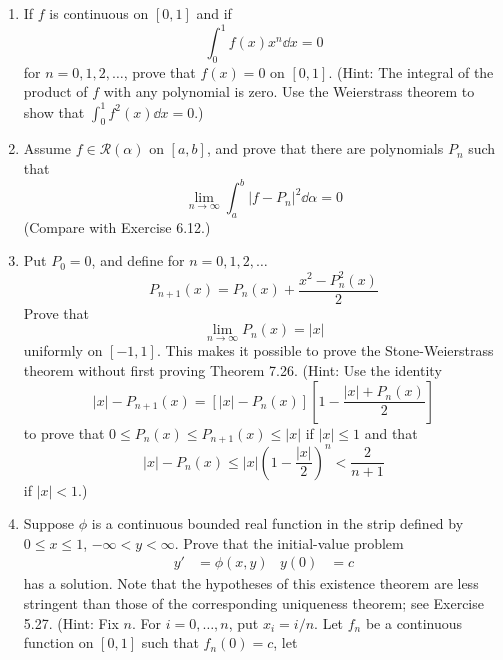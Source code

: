 \documentclass[../psets.tex]{subfiles}
\begin{document}
\begin{enumerate}[label={\textbf{\arabic*.}}]
    \item If $f$ is continuous on $[0,1]$ and if
    \begin{equation*}
        \int_0^1f(x)x^n\dd{x} = 0
    \end{equation*}
    for $n=0,1,2,\dots$, prove that $f(x)=0$ on $[0,1]$. (Hint: The integral of the product of $f$ with any polynomial is zero. Use the Weierstrass theorem to show that $\int_0^1f^2(x)\dd{x}=0$.)
    \item Assume $f\in\mathscr{R}(\alpha)$ on $[a,b]$, and prove that there are polynomials $P_n$ such that
    \begin{equation*}
        \lim_{n\to\infty}\int_a^b|f-P_n|^2\dd{\alpha} = 0
    \end{equation*}
    (Compare with Exercise 6.12.)
    \item Put $P_0=0$, and define for $n=0,1,2,\dots$
    \begin{equation*}
        P_{n+1}(x) = P_n(x)+\frac{x^2-P_n^2(x)}{2}
    \end{equation*}
    Prove that
    \begin{equation*}
        \lim_{n\to\infty}P_n(x) = |x|
    \end{equation*}
    uniformly on $[-1,1]$. This makes it possible to prove the Stone-Weierstrass theorem without first proving Theorem 7.26. (Hint: Use the identity
    \begin{equation*}
        |x|-P_{n+1}(x) = [|x|-P_n(x)]\left[ 1-\frac{|x|+P_n(x)}{2} \right]
    \end{equation*}
    to prove that $0\leq P_n(x)\leq P_{n+1}(x)\leq|x|$ if $|x|\leq 1$ and that
    \begin{equation*}
        |x|-P_n(x) \leq |x|\left( 1-\frac{|x|}{2} \right)^n < \frac{2}{n+1}
    \end{equation*}
    if $|x|<1$.)
    \item Suppose $\phi$ is a continuous bounded real function in the strip defined by $0\leq x\leq 1$, $-\infty <y<\infty$. Prove that the initial-value problem
    \begin{align*}
        y' &= \phi(x,y)&
        y(0) &= c
    \end{align*}
    has a solution. Note that the hypotheses of this existence theorem are less stringent than those of the corresponding uniqueness theorem; see Exercise 5.27. (Hint: Fix $n$. For $i=0,\dots,n$, put $x_i=i/n$. Let $f_n$ be a continuous function on $[0,1]$ such that $f_n(0)=c$, let
    \begin{equation*}

\end{equation*}
\end{enumerate}
\end{document}
